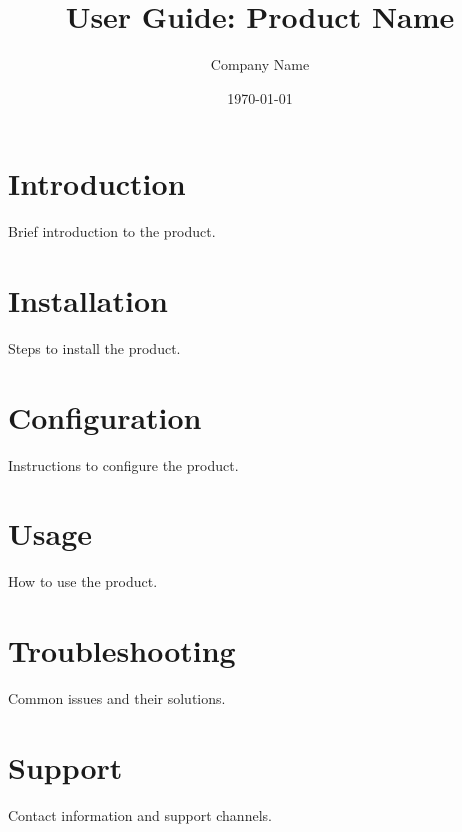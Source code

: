 \documentclass[11pt]{article}
\title{User Guide: \textbf{Product Name}}
\author{Company Name}
\date{\today}
\begin{document}
\maketitle
\tableofcontents
\newpage

\section{Introduction}
Brief introduction to the product.

\section{Installation}
Steps to install the product.

\section{Configuration}
Instructions to configure the product.

\section{Usage}
How to use the product.

\section{Troubleshooting}
Common issues and their solutions.

\section{Support}
Contact information and support channels.
\end{document}
